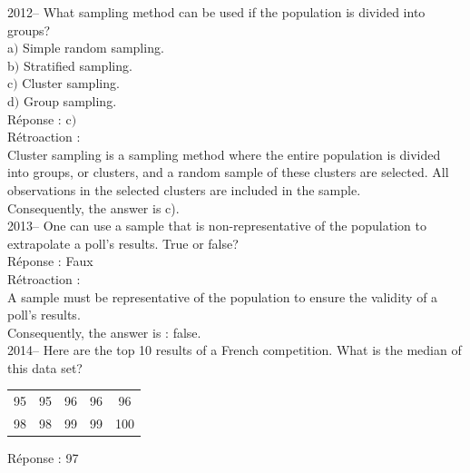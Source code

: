\documentclass[letterpaper, 12pt]{article}
\begin{document}
2012-- What sampling method can be used if the population is divided into groups? \\

a$)$ Simple random sampling.\\
b$)$ Stratified sampling.\\
c$)$ Cluster sampling.\\
d$)$ Group sampling.\\


R\'eponse : c$)$\\

R\'etroaction :\\
Cluster sampling is a sampling method where the entire population is divided into groups, or clusters, and a random sample of these clusters are selected. All observations in the selected clusters are included in the sample.\\
Consequently, the answer is c).\\

2013-- One can use a sample that is non-representative of the population to extrapolate a poll's results. True or false? \\

R\'eponse : Faux\\

R\'etroaction :\\
A sample must be representative of the population to ensure the validity of a poll's results.\\
Consequently, the answer is : false.\\


2014-- Here are the top 10 results of a French competition. What is the median of this data set?  \\
\begin{center}
 \begin{tabular}{|c  c  c  c  c|} \hline

95 & 95 & 96 & 96 & 96 \\
98 & 98 & 99 & 99 & 100 \\ \hline

\end{tabular}
\end{center}

R\'eponse : 97\\
\end{document}

